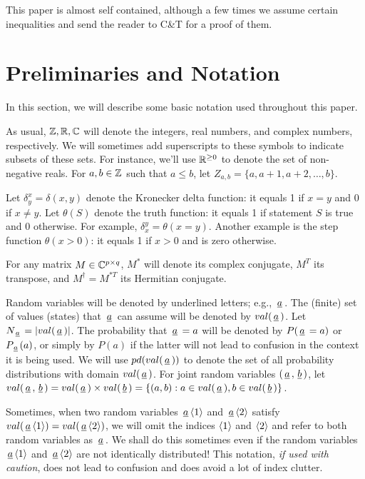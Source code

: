\documentclass[12pt]{article}
\begin{document}
This paper is almost self contained,
although a few times we
assume
certain inequalities
and send the reader to C\&T for a proof
of them.

\section{Preliminaries and Notation}

In this section, we
will describe
some basic notation
used throughout this paper.


As usual, ${\mathbb{Z}},{ \mathbb{R}}, { \mathbb{C}}$
will denote the integers, real numbers,
and complex numbers, respectively.
We will sometimes
add superscripts to these
symbols to indicate subsets of
these sets. For instance,
we'll use ${ \mathbb{R}}^{\geq 0}$
to denote the set of non-negative reals.
For $a,b\in{\mathbb{Z}}$ such that $a\leq b$,
let
 $Z_{a,b}=\{a,a+1,a+2,\ldots, b\}$.

 Let
$\delta^x_{y}=\delta(x,y)$
denote the Kronecker delta function:
it equals 1 if $x=y$ and 0 if $x\neq y$.
Let $\theta(S)$ denote the truth function:
it equals 1 if statement
$S$ is true and 0 otherwise.
For example, $\delta_x^y = \theta(x=y)$.
Another example is the step function $\theta(x>0)$:
it equals 1 if $x>0$ and is zero otherwise.

For any matrix $M\in { \mathbb{C}}^{p\times q}$,
$M^*$ will denote its complex conjugate,
$M^T$ its transpose, and $M^\dagger = M^{*T}$
its Hermitian conjugate.

Random variables will be denoted
by underlined letters; e.g.,
${\,\underline{a}\,}$.
The (finite) set of values (states) that
${\,\underline{a}\,}$ can assume will be denoted
by $val({\,\underline{a}\,})$. Let $N_{\,\underline{a}\,}=|val({\,\underline{a}\,})|$.
The probability that
${\,\underline{a}\,}=a$ will be denoted by $P({\,\underline{a}\,}=a)$
or $P_{\,\underline{a}\,}(a)$, or simply by $P(a)$
if the latter will not lead to confusion
in the context it is being used.
We will use $pd(val({\,\underline{a}\,}))$ to denote
the set of all probability distributions
with domain $val({\,\underline{a}\,})$. For joint random variables
$({\,\underline{a}\,},{\,\underline{b}\,})$, let
$val({\,\underline{a}\,},{\,\underline{b}\,}) =
val({\,\underline{a}\,})\times val({\,\underline{b}\,})=
\{(a,b):a\in val({\,\underline{a}\,}), b\in val({\,\underline{b}\,})\}$.

Sometimes, when
two random variables ${\,\underline{a}\,}\langle1\rangle$ and
${\,\underline{a}\,}\langle2\rangle$ satisfy
$val({\,\underline{a}\,}\langle1\rangle)=val({\,\underline{a}\,}\langle2\rangle)$,
we will omit the indices $\langle1\rangle$
and $\langle2\rangle$ and refer to both
random variables as ${\,\underline{a}\,}$.
We shall do this sometimes
even if the
random variables ${\,\underline{a}\,}\langle1\rangle$
 and ${\,\underline{a}\,}\langle2\rangle$ are not identically distributed!
This notation, {\it if used with caution},
does not lead to confusion and
does avoid a lot of index clutter.
\end{document}
